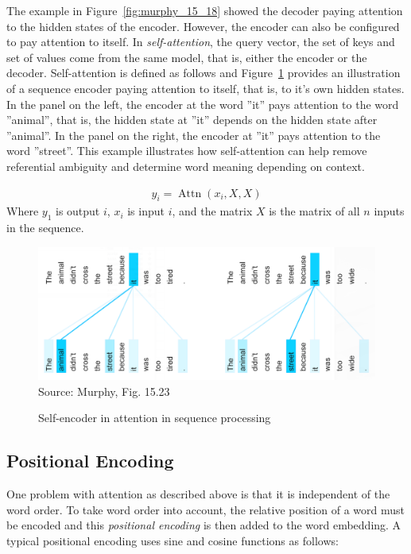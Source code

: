 The example in Figure~\ref{fig:murphy_15_18} showed the decoder paying attention to the hidden states of the encoder. However, the encoder can also be configured to pay attention to itself. In \emph{self-attention}, the query vector, the set of keys and set of values come from the same model, that is, either the encoder or the decoder. Self-attention is defined as follows and Figure~\ref{fig:murphy_15_23} provides an illustration of a sequence encoder paying attention to itself, that is, to it's own hidden states. In the panel on the left, the encoder at the word ''it'' pays attention to the word ''animal'', that is, the hidden state at ''it'' depends on the hidden state after ''animal''. In the panel on the right, the encoder at ''it'' pays attention to the word ''street''. This example illustrates how self-attention can help remove referential ambiguity and determine word meaning depending on context. 

\begin{align*}
y_i = \operatorname{Attn}(x_i, X, X)
\end{align*}
Where $y_1$ is output $i$, $x_i$ is input $i$, and the matrix $X$ is the matrix of all $n$ inputs in the sequence. 

\begin{figure}
\begin{center}
\includegraphics[width=\textwidth]{murphy_15_23.png} \\

\scriptsize Source: Murphy, Fig. 15.23 \normalsize
\end{center}
\caption{Self-encoder in attention in sequence processing}
\label{fig:murphy_15_23}
\end{figure}


\subsection*{Positional Encoding}

One problem with attention as described above is that it is independent of the word order. To take word order into account, the relative position of a word must be encoded and this \emph{positional encoding} is then added to the word embedding. A typical positional encoding uses sine and cosine functions as follows:

